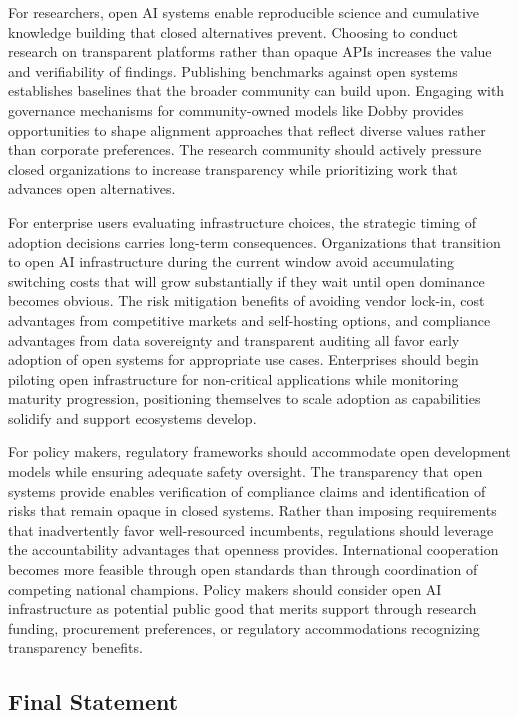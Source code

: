 For researchers, open AI systems enable reproducible science and cumulative knowledge building that closed alternatives prevent. Choosing to conduct research on transparent platforms rather than opaque APIs increases the value and verifiability of findings. Publishing benchmarks against open systems establishes baselines that the broader community can build upon. Engaging with governance mechanisms for community-owned models like Dobby provides opportunities to shape alignment approaches that reflect diverse values rather than corporate preferences. The research community should actively pressure closed organizations to increase transparency while prioritizing work that advances open alternatives.

For enterprise users evaluating infrastructure choices, the strategic timing of adoption decisions carries long-term consequences. Organizations that transition to open AI infrastructure during the current window avoid accumulating switching costs that will grow substantially if they wait until open dominance becomes obvious. The risk mitigation benefits of avoiding vendor lock-in, cost advantages from competitive markets and self-hosting options, and compliance advantages from data sovereignty and transparent auditing all favor early adoption of open systems for appropriate use cases. Enterprises should begin piloting open infrastructure for non-critical applications while monitoring maturity progression, positioning themselves to scale adoption as capabilities solidify and support ecosystems develop.

For policy makers, regulatory frameworks should accommodate open development models while ensuring adequate safety oversight. The transparency that open systems provide enables verification of compliance claims and identification of risks that remain opaque in closed systems. Rather than imposing requirements that inadvertently favor well-resourced incumbents, regulations should leverage the accountability advantages that openness provides. International cooperation becomes more feasible through open standards than through coordination of competing national champions. Policy makers should consider open AI infrastructure as potential public good that merits support through research funding, procurement preferences, or regulatory accommodations recognizing transparency benefits.

\subsection{Final Statement}

